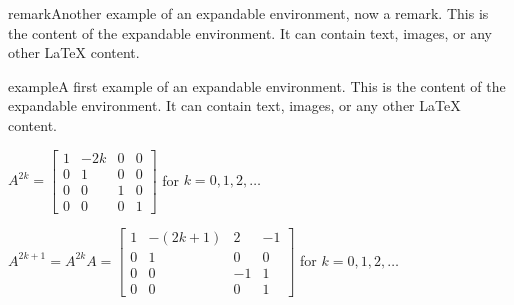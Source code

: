 \documentclass{ximera}
\begin{document}
\begin{expandable}{remark}{Another example of an expandable environment, now a remark.}
This is the content of the expandable environment. It can contain text, images, or any other LaTeX content.
\end{expandable}

\begin{expandable}{example}{A first example of an expandable environment.}
    This is the content of the expandable environment. It can contain text, images, or any other LaTeX content.
\end{expandable}



\begin{expandable}{}{}
    $
    A^{2k} = \left[ \begin{array}{rc|rr}
    1 & -2k & 0 & 0 \\
    0 & 1 & 0 & 0 \\
    \hline
    0 & 0 & 1 & 0 \\
    0 & 0 & 0 & 1
    \end{array} \right]$ for $k = 0, 1, 2, \dots$
    
    $A^{2k + 1} = A^{2k}A = \left[ \begin{array}{rc|rr}
    1 & -(2k + 1) & 2 & -1 \\
    0 & 1 & 0 & 0 \\
    \hline
    0 & 0 & -1 & 1 \\
    0 & 0 & 0 & 1
    \end{array} \right]$ for $k = 0, 1, 2, \dots$
\end{expandable}




\hrulefill
\end{document}
